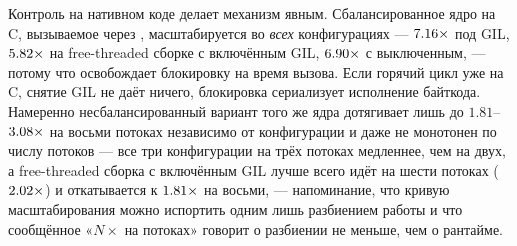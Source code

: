 Контроль на нативном коде делает механизм явным. Сбалансированное ядро на C, вызываемое через
, масштабируется во \emph{всех} конфигурациях --- $\meas{ratio:b4_threads-gil:c_ffi_uniform/gil/T1|b4_threads-gil:c_ffi_uniform/gil/T8}{7.16}\times$ под GIL, $\meas{ratio:b4_threads-ft_gil:c_ffi_uniform/ft_gil/T1|b4_threads-ft_gil:c_ffi_uniform/ft_gil/T8}{5.82}\times$
на free-threaded сборке с включённым GIL, $\meas{ratio:b4_threads-ft:c_ffi_uniform/ft/T1|b4_threads-ft:c_ffi_uniform/ft/T8}{6.90}\times$ с выключенным, --- потому что 
освобождает блокировку на время вызова. Если горячий цикл уже на C, снятие GIL не даёт ничего,
блокировка сериализует исполнение байткода. Намеренно несбалансированный вариант того же ядра
дотягивает лишь до $1.81$--$\meas{ratio:b4_threads-gil:c_ffi_mandelbrot/gil/T1_control|b4_threads-gil:c_ffi_mandelbrot/gil/T8}{3.08}\times$ на восьми потоках независимо от конфигурации и даже не
монотонен по числу потоков --- все три конфигурации на трёх потоках медленнее, чем на двух, а
free-threaded сборка с включённым GIL лучше всего идёт на шести потоках ($\meas{ratio:b4_threads-ft_gil:c_ffi_mandelbrot/ft_gil/T1_control|b4_threads-ft_gil:c_ffi_mandelbrot/ft_gil/T6}{2.02}\times$) и
откатывается к $\meas{ratio:b4_threads-ft_gil:c_ffi_mandelbrot/ft_gil/T1_control|b4_threads-ft_gil:c_ffi_mandelbrot/ft_gil/T8}{1.81}\times$ на восьми, --- напоминание, что кривую
масштабирования можно испортить одним лишь разбиением работы и что сообщённое «$N\times$ на
потоках» говорит о разбиении не меньше, чем о рантайме.

